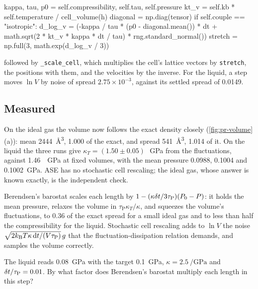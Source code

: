 \begin{code}
        kappa, tau, p0 = self.compressibility, self.tau, self.pressure
        kt_v = self.kb * self.temperature / cell_volume(h)
        diagonal = np.diag(tensor)
        if self.couple == "isotropic":
            d_log_v = (-kappa / tau * (p0 - diagonal.mean()) * dt
                       + math.sqrt(2 * kt_v * kappa * dt / tau)
                       * rng.standard_normal())
            stretch = np.full(3, math.exp(d_log_v / 3))
\end{code}

\noindent followed by \texttt{\_scale\_cell}, which multiplies the cell's
lattice vectors by \texttt{stretch}, the positions with them, and the
velocities by the inverse. For the liquid, a step moves $\ln V$ by noise
of spread $2.75\times10^{-3}$, against its settled spread of 0.0149.

\subsection*{Measured}

On the ideal gas the volume now follows the exact density closely
(\cref{fig:pr-volume}(a)): mean \SI{2444}{\angstrom\cubed}, 1.000 of the
exact, and spread \SI{541}{\angstrom\cubed}, 1.014 of it. On the liquid
the three runs give $\kappa_T = (1.50 \pm 0.05)$\,\si{\per\giga\pascal}
from the fluctuations, against \SI{1.46}{\per\giga\pascal} at fixed
volumes, with the mean pressure 0.0988, 0.1004 and
\SI{0.1002}{\giga\pascal}. ASE has no stochastic cell rescaling; the
ideal gas, whose answer is known exactly, is the independent check.

\begin{keyidea}
Berendsen's barostat scales each length by $1 - (\kappa\delta t/3\tau_{\mathrm
P})(P_0 - P)$: it holds the mean pressure, relaxes the volume in
$\tau_{\mathrm P}\kappa_T/\kappa$, and squeezes the volume's fluctuations,
to 0.36 of the exact spread for a small ideal gas and to less than half
the compressibility for the liquid. Stochastic cell rescaling adds to $\ln V$
the noise $\sqrt{2k_{\mathrm{B}} T\kappa\,\mathrm{d} t/(V\tau_{\mathrm P})}\,g$ that the
fluctuation-dissipation relation demands, and samples the volume
correctly.
\end{keyidea}


\begin{selfcheck}
The liquid reads \SI{0.08}{\giga\pascal} with the target
\SI{0.1}{\giga\pascal}, $\kappa = \SI{2.5}{\per\giga\pascal}$ and
$\delta t/\tau_{\mathrm P} = 0.01$. By what factor does Berendsen's barostat
multiply each length in this step?
\end{selfcheck}
